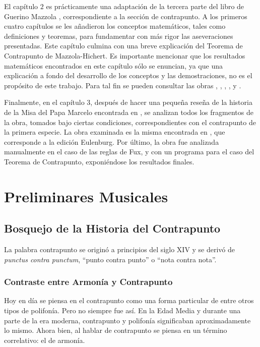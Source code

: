 \documentclass[letterpaper,12pt]{book}
\theoremstyle{definition} \newtheorem{Def}{Definición}[chapter]
\theoremstyle{definition} \newtheorem{Teo}{Teorema}[chapter]
\theoremstyle{definition} \newtheorem{Pro}{Proposición}[chapter]
\theoremstyle{definition} \newtheorem{Lema}{Lema}[chapter]
\begin{document}
El capítulo $2$ es prácticamente una adaptación de la tercera parte del libro de Guerino Mazzola \cite{Verite}, correspondiente a la sección de contrapunto. A los primeros cuatro capítulos se les añadieron los conceptos matemáticos, tales como definiciones y teoremas, para fundamentar con más rigor las aseveraciones presentadas. Este capítulo culmina con una breve explicación del Teorema de Contrapunto de Mazzola-Hichert. Es importante mencionar que los resultados matemáticos encontrados en este capítulo sólo se enuncian, ya que una explicación a fondo del desarrollo de los conceptos y las demostraciones, no es el propósito de este trabajo. Para tal fin se pueden consultar las obras \cite{TesisOctavio}, \cite{GruposTMM}, \cite{Grupos}, \cite{Topos}, \cite{Status} y \cite{Algebra}.  

Finalmente, en el capítulo $3$, después de hacer una pequeña reseña de la historia de la Misa del Papa Marcelo encontrada en \cite{MisaHistoria}, se analizan todos los fragmentos de la obra, tomados bajo ciertas condiciones, correspondientes con el contrapunto de la primera especie. La obra examinada es la misma encontrada en \cite{Misa}, que corresponde a la edición Eulenburg. Por último, la obra fue analizada manualmente en el caso de las reglas de Fux, y con un programa para el caso del Teorema de Contrapunto, exponiéndose los resultados finales.  

\mainmatter

\chapter{Preliminares Musicales}

\section{Bosquejo de la Historia del Contrapunto}

La palabra contrapunto se originó a principios del siglo XIV y se derivó de \emph{punctus contra punctum}, ``punto contra punto'' o ``nota contra nota''.

\subsection{Contraste entre Armonía y Contrapunto}

Hoy en día se piensa en el contrapunto como una forma particular de entre otros tipos de polifonía. Pero no siempre fue así. En la Edad Media y durante una parte de la era moderna, contrapunto y polifonía significaban aproximadamente lo mismo. Ahora bien, al hablar de contrapunto se piensa en un término correlativo: el de armonía.
\end{document}
